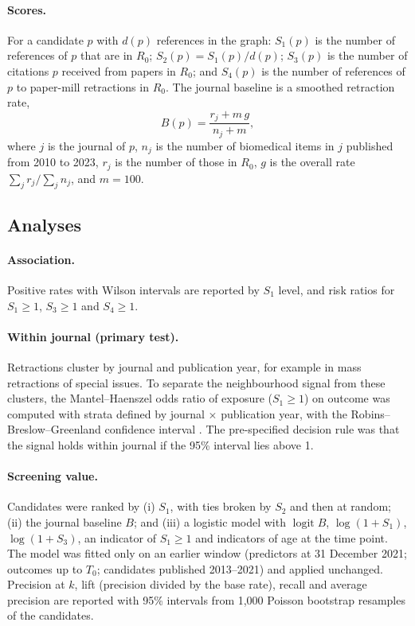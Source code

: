 \paragraph{Scores.} For a candidate $p$ with $d(p)$ references in the graph:
$S_1(p)$ is the number of references of $p$ that are in $R_0$;
$S_2(p) = S_1(p)/d(p)$;
$S_3(p)$ is the number of citations $p$ received from papers in $R_0$; and
$S_4(p)$ is the number of references of $p$ to paper-mill retractions in $R_0$.
The journal baseline is a smoothed retraction rate,
\[
B(p) = \frac{r_j + m\,g}{n_j + m},
\]
where $j$ is the journal of $p$, $n_j$ is the number of biomedical items in $j$ published from 2010 to 2023,
$r_j$ is the number of those in $R_0$, $g$ is the overall rate $\sum_j r_j / \sum_j n_j$, and $m = 100$.

\subsection{Analyses}
\paragraph{Association.} Positive rates with Wilson intervals \citep{wilson1927} are reported by $S_1$ level, and risk
ratios for $S_1 \ge 1$, $S_3 \ge 1$ and $S_4 \ge 1$.

\paragraph{Within journal (primary test).} Retractions cluster by journal and publication year, for example in
mass retractions of special issues. To separate the neighbourhood signal from these clusters, the Mantel--Haenszel odds
ratio \citep{mantel1959} of exposure ($S_1 \ge 1$) on outcome was computed with strata defined by journal $\times$
publication year, with the Robins--Breslow--Greenland confidence interval \citep{robins1986estimator}. The
pre-specified decision rule was that the signal holds within journal if the 95\% interval lies above 1.

\paragraph{Screening value.} Candidates were ranked by (i) $S_1$, with ties broken by $S_2$ and then at random;
(ii) the journal baseline $B$; and (iii) a logistic model with $\operatorname{logit} B$, $\log(1+S_1)$,
$\log(1+S_3)$, an indicator of $S_1 \ge 1$ and indicators of age at the time point. The model was fitted only on an
earlier window (predictors at 31 December 2021; outcomes up to $T_0$; candidates published 2013--2021) and applied
unchanged. Precision at $k$, lift (precision divided by the base rate), recall and average precision
\citep{saito2015prc} are reported with 95\% intervals from 1,000 Poisson bootstrap resamples of the candidates.

